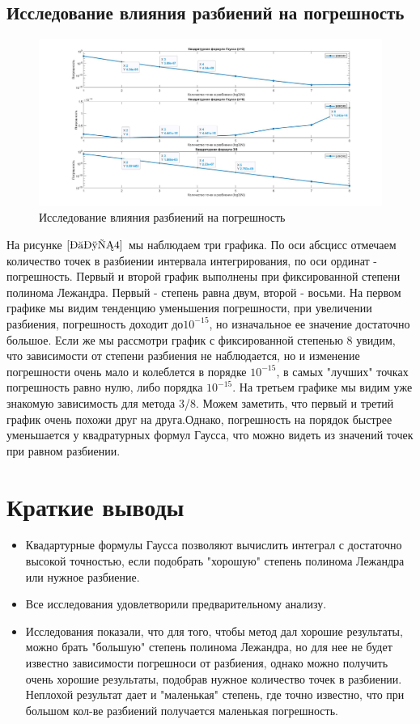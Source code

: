 \documentclass[a4paper]{article}
\begin{document}
\subsection{Исследование влияния разбиений на погрешность}
\begin{figure}[h!]
\begin{center}
\includegraphics[scale=0.3]{сравнение.jpg} 
\end{center}
\caption{Исследование влияния разбиений на погрешность} \label{Рис4}
\end{figure}
На рисунке $\ref{Рис4}$ мы наблюдаем три графика. По оси абсцисс отмечаем количество точек в разбиении интервала интегрирования, по оси ординат - погрешность. Первый и второй график выполнены при фиксированной степени полинома Лежандра. Первый - степень равна двум, второй - восьми. На первом графике мы видим тенденцию уменьшения погрешности, при увеличении разбиения, погрешность доходит до$10^{-15}$, но изначальное ее значение достаточно большое. Если же мы рассмотри график с фиксированной степенью 8 увидим, что зависимости от степени разбиения не наблюдается, но и изменение погрешности очень мало и колеблется в порядке $10^{-15}$, в самых "лучших" точках погрешность равно нулю, либо порядка $10^{-15}$. 
На третьем графике мы видим уже знакомую зависимость для метода 3/8. Можем заметить, что первый и третий график очень похожи друг на друга.Однако, погрешность на порядок быстрее уменьшается у квадратурных формул Гаусса, что можно видеть из значений точек при равном разбиении.


\newpage
\section{Краткие выводы} 

\begin{itemize}
  \item Квадартурные формулы Гаусса позволяют вычислить интеграл с достаточно высокой точностью, если подобрать "хорошую" степень полинома Лежандра или нужное разбиение.
  \item Все исследования удовлетворили предварительному анализу.
  \item Исследования показали, что для того, чтобы метод дал хорошие результаты, можно брать "большую" степень полинома Лежандра, но для нее не будет известно зависимости погрешноси от разбиения, однако можно получить очень хорошие результаты, подобрав нужное количество точек в разбиении. Неплохой результат дает и "маленькая" степень, где точно известно, что при большом кол-ве разбиений получается маленькая погрешность. 
  \end{itemize}
\end{document}

